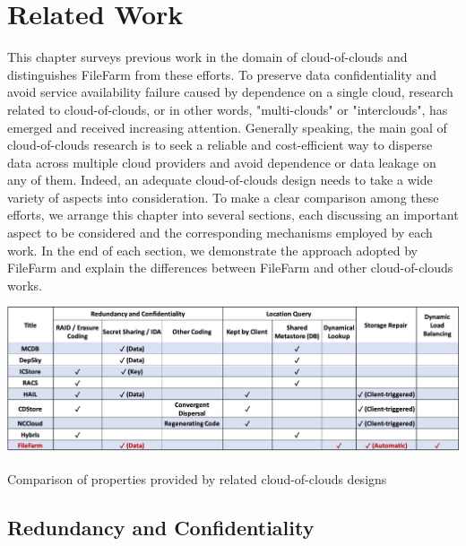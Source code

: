 \chapter{Related Work}
\label{c:related_work}

This chapter surveys previous work in the domain of cloud-of-clouds and distinguishes FileFarm from these efforts. To preserve data confidentiality and avoid service availability failure caused by dependence on a single cloud, research related to cloud-of-clouds, or in other words, "multi-clouds" or "interclouds", has emerged and received increasing attention. Generally speaking, the main goal of cloud-of-clouds research is to seek a reliable and cost-efficient way to disperse data across multiple cloud providers and avoid dependence or data leakage on any of them. Indeed, an adequate cloud-of-clouds design needs to take a wide variety of aspects into consideration. To make a clear comparison among these efforts, we arrange this chapter into several sections, each discussing an important aspect to be considered and the corresponding mechanisms employed by each work. In the end of each section, we demonstrate the approach adopted by FileFarm and explain the differences between FileFarm and other cloud-of-clouds works.

\begin{table}[!b]
\centering
  \includegraphics[width=15cm]{tables/table_property_comparison.png}
  \caption{Comparison of properties provided by related cloud-of-clouds designs}
  \label{table:propertycomparison}
\end{table}

\section{Redundancy and Confidentiality}
\label{ss:cocredundancyandconfidentiality}

